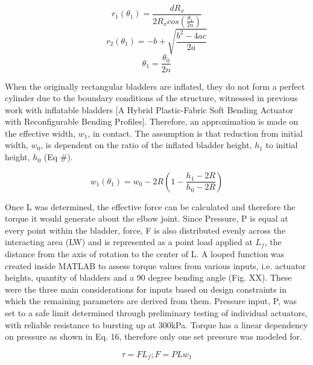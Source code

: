 \begin{equation}
	r_1(\theta_1)  = \frac{dR_x}{2R_xcos(\frac{\theta_1}{2\textit{n}})}
\end{equation}
 \begin{equation}
	r_2(\theta_1)  = -b + \sqrt{\frac{b^2-4ac}{2a}}
\end{equation}
\begin{equation}
\theta_1 = \frac{\theta_0}{2\textit{n}}
\end{equation}

When the originally rectangular bladders are inflated, they do not form a perfect cylinder due to the boundary conditions of the structure, witnessed in previous work with inflatable bladders [A Hybrid Plastic-Fabric Soft Bending Actuator with Reconfigurable Bending Profiles]. Therefore, an approximation is made on the effective width, $w_1$, in contact. The assumption is that reduction from initial width, $w_0$, is dependent on the ratio of the inflated bladder height, $h_1$ to initial height, $h_0$ (Eq #).

\begin{equation}
	w_1(\theta_1)  = w_0-2R(1-\frac{h_1-2R}{h_0-2R})
\end{equation}

Once L was determined, the effective force can be calculated and therefore the torque it would generate about the elbow joint. Since Pressure, P is equal at every point within the bladder, force, F is also distributed evenly across the interacting area (LW) and is represented as a point load applied at $L_f$, the distance from the axis of rotation to the center of L.
A looped function was created inside MATLAB to assess torque values from various inputs, i.e. actuator heights, quantity of bladders and a 90 degree bending angle (Fig. XX). These were the three main considerations for inputs based on design constraints in which the remaining parameters are derived from them. Pressure input, P,  was set to a safe limit determined through preliminary testing of individual actuators, with reliable resistance to bursting up at 300kPa. Torque has a linear dependency on pressure as shown in Eq. 16, therefore only one set pressure was modeled for. 

\begin{equation}\label{eq. X16}
	\tau = FL_f ; F = PLw_1 
\end{equation}
